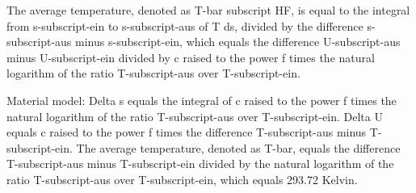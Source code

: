 The average temperature, denoted as T-bar subscript HF, is equal to the integral from s-subscript-ein to s-subscript-aus of T ds, divided by the difference s-subscript-aus minus s-subscript-ein, which equals the difference U-subscript-aus minus U-subscript-ein divided by c raised to the power f times the natural logarithm of the ratio T-subscript-aus over T-subscript-ein.

Material model:
Delta s equals the integral of c raised to the power f times the natural logarithm of the ratio T-subscript-aus over T-subscript-ein.
Delta U equals c raised to the power f times the difference T-subscript-aus minus T-subscript-ein.
The average temperature, denoted as T-bar, equals the difference T-subscript-aus minus T-subscript-ein divided by the natural logarithm of the ratio T-subscript-aus over T-subscript-ein, which equals 293.72 Kelvin.
